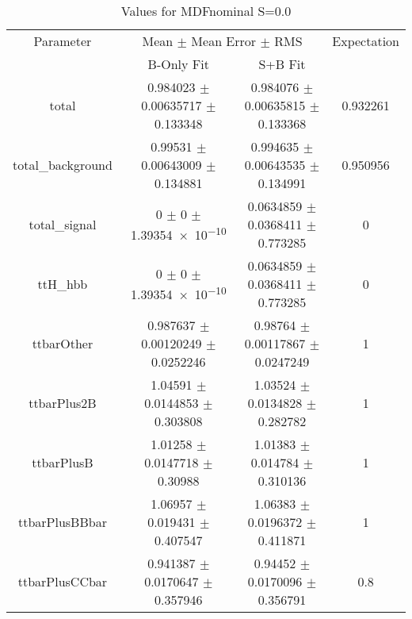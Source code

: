 \begin{table}
\centering
\caption{Values for MDFnominal S=0.0}
\begin{tabular}{cccc}
\toprule
Parameter & \multicolumn{2}{c}{Mean $\pm$ Mean Error $\pm$ RMS} & Expectation\\
 & B-Only Fit & S+B Fit & \\
\midrule
total & \num{0.984023} $\pm$ \num{0.00635717} $\pm$ \num{0.133348} & \num{0.984076} $\pm$ \num{0.00635815} $\pm$ \num{0.133368} & \num{0.932261}\\
total\_background & \num{0.99531} $\pm$ \num{0.00643009} $\pm$ \num{0.134881} & \num{0.994635} $\pm$ \num{0.00643535} $\pm$ \num{0.134991} & \num{0.950956}\\
total\_signal & \num{0} $\pm$ \num{0} $\pm$ \num{1.39354e-10} & \num{0.0634859} $\pm$ \num{0.0368411} $\pm$ \num{0.773285} & \num{0}\\
ttH\_hbb & \num{0} $\pm$ \num{0} $\pm$ \num{1.39354e-10} & \num{0.0634859} $\pm$ \num{0.0368411} $\pm$ \num{0.773285} & \num{0}\\
ttbarOther & \num{0.987637} $\pm$ \num{0.00120249} $\pm$ \num{0.0252246} & \num{0.98764} $\pm$ \num{0.00117867} $\pm$ \num{0.0247249} & \num{1}\\
ttbarPlus2B & \num{1.04591} $\pm$ \num{0.0144853} $\pm$ \num{0.303808} & \num{1.03524} $\pm$ \num{0.0134828} $\pm$ \num{0.282782} & \num{1}\\
ttbarPlusB & \num{1.01258} $\pm$ \num{0.0147718} $\pm$ \num{0.30988} & \num{1.01383} $\pm$ \num{0.014784} $\pm$ \num{0.310136} & \num{1}\\
ttbarPlusBBbar & \num{1.06957} $\pm$ \num{0.019431} $\pm$ \num{0.407547} & \num{1.06383} $\pm$ \num{0.0196372} $\pm$ \num{0.411871} & \num{1}\\
ttbarPlusCCbar & \num{0.941387} $\pm$ \num{0.0170647} $\pm$ \num{0.357946} & \num{0.94452} $\pm$ \num{0.0170096} $\pm$ \num{0.356791} & \num{0.8}\\
\bottomrule
\end{tabular}
\end{table}